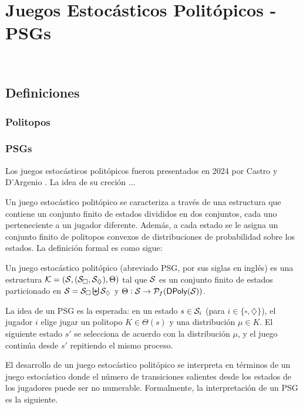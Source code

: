 \chapter{Juegos Estocásticos Politópicos - PSGs}
~\label{cap:psg}

\section{Definiciones}

\subsection{Politopos}

\subsection{PSGs}

Los juegos estocásticos politópicos fueron presentados en 2024 por Castro y
D'Argenio \cite{Polytopal}. La idea de su creción ...

Un juego estocástico politópico se caracteriza a través de una estructura que
contiene un conjunto finito de estados divididos en dos conjuntos, cada uno
perteneciente a un jugador diferente. Además, a cada estado se le asigna un
conjunto finito de politopos convexos de distribuciones de probabilidad sobre
los estados. La definición formal es como sigue:

\begin{definition}[PSG]
	Un juego estocástico politópico (abreviado PSG, por sus siglas en inglés) es una estructura \( \mathcal{K} = (\mathcal{S}, (\mathcal{S}_\square, \mathcal{S}_\diamondsuit), \Theta) \) tal que \( \mathcal{S} \) es un conjunto finito de estados particionado en \( \mathcal{S} = \mathcal{S}_\square \biguplus \mathcal{S}_\diamondsuit \) y \( \Theta : \mathcal{S} \to \mathcal{P}_f(\textsf{DPoly}(\mathcal{S})) \).
\end{definition}

La idea de un PSG es la esperada: en un estado \( s \in \mathcal{S}_i \) (para \( i \in
\{ \square, \diamondsuit \} \)), el jugador \( i \) elige jugar un politopo \(
K \in \Theta(s) \) y una distribución \( \mu \in K \). El siguiente estado \(
s' \) se selecciona de acuerdo con la distribución \( \mu \), y el juego
continúa desde \( s' \) repitiendo el mismo proceso.

El desarrollo de un juego estocástico politópico se interpreta en términos de
un juego estocástico donde el número de transiciones salientes desde los
estados de los jugadores puede ser no numerable. Formalmente, la interpretación
de un PSG es la siguiente.


